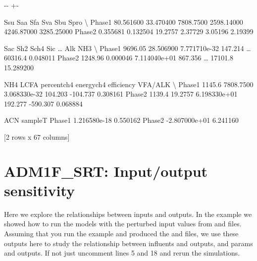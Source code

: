 \documentclass[a4paper,10pt,english]{sphinxmanual}
\newlength\nbsphinxcodecellspacing
\begin{document}
{

\kern-\sphinxverbatimsmallskipamount\kern-\baselineskip
\kern+\FrameHeightAdjust\kern-\fboxrule
\vspace{\nbsphinxcodecellspacing}

\begin{sphinxVerbatim}[commandchars=\\\{\}]
\llap{\color{nbsphinxout}[16]:\,\hspace{\fboxrule}\hspace{\fboxsep}}             Ssu        Saa        Sfa         Sva         Sbu        Spro   \textbackslash{}
Phase1  80.561600  33.470400  7808.7500  2598.14000  4246.87000  3285.25000
Phase2   0.355681   0.132504    19.2757     2.37729     3.05196     2.19399

           Sac        Sh2          Sch4      Sic   {\ldots}     Alk        NH3   \textbackslash{}
Phase1  9696.05  28.506900  7.771710e-32  147.214  {\ldots}  60316.4   0.048011
Phase2  1248.96   0.000046  7.114040e+01  867.356  {\ldots}  17101.8  15.289200

          NH4       LCFA    percentch4    energych4   efficiency   VFA/ALK  \textbackslash{}
Phase1  1145.6  7808.7500  3.068330e-32      104.203    -104.737  0.308161
Phase2  1139.4    19.2757  6.198330e+01      192.277    -590.307  0.068884

                 ACN   sampleT
Phase1  1.216580e-18  0.550162
Phase2 -2.807000e+01  6.241160

[2 rows x 67 columns]
\end{sphinxVerbatim}
}

{
\begin{sphinxVerbatim}[commandchars=\\\{\}]
\llap{\color{nbsphinxin}[ ]:\,\hspace{\fboxrule}\hspace{\fboxsep}}
\end{sphinxVerbatim}
}


\section{ADM1F\_SRT: Input/output sensitivity}
\label{\detokenize{jupyter_notebook/io_sensitivity_analysis:ADM1F_SRT:-Input/output-sensitivity}}\label{\detokenize{jupyter_notebook/io_sensitivity_analysis::doc}}
\sphinxAtStartPar
Here we explore the relationships between inputs and outputs. In the  example we showed how to run the models with the perturbed input values from  and  files. Assuming that you run the  example and produced the  and  files, we use these outputs here to study the relationship between influents and outputs, and params and outputs. If not just uncomment lines 5 and 18 and
re\sphinxhyphen{}run the simulations.
\end{document}
